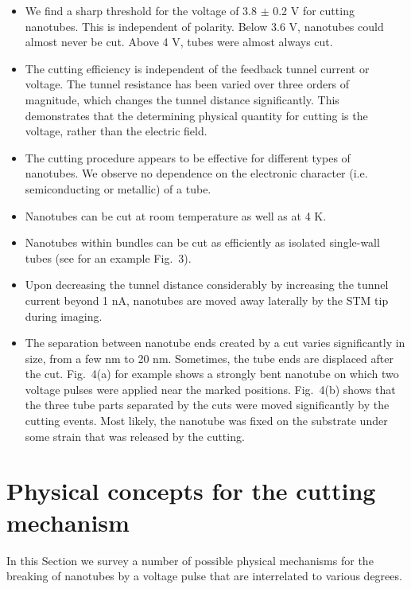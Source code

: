 \begin{multicols}{2}
\begin{itemize}
\item We find a sharp threshold for the voltage of 3.8 $\pm $ 0.2 V for cutting
nanotubes. This is independent of polarity. Below 3.6 V, nanotubes
could almost never be cut. Above 4 V, tubes were almost always
cut.

\item The cutting efficiency is independent of the feedback tunnel current
or voltage. The tunnel resistance has been varied over three
orders of magnitude, which changes the tunnel distance
significantly. This demonstrates that the determining physical
quantity for cutting is the voltage, rather than the electric
field.

\item The cutting procedure appears to be effective for different types
of nanotubes. We observe no dependence on the electronic character
(i.e. semiconducting or metallic) of a tube.

\item Nanotubes can be cut at room temperature as well as at 4 K.

\item Nanotubes within bundles can be cut as efficiently as isolated
single-wall tubes (see for an example Fig.~3).

\item Upon decreasing the tunnel distance considerably by increasing the tunnel
current beyond 1 nA, nanotubes are moved away laterally by the STM
tip during imaging.

\item The separation between nanotube ends created by a cut varies
significantly in size, from a few nm to 20 nm. Sometimes, the tube
ends are displaced after the cut. Fig.~4(a) for example shows a
strongly bent nanotube on which two voltage pulses were applied
near the marked positions. Fig.~4(b) shows that the three tube
parts separated by the cuts were moved significantly by the
cutting events. Most likely, the nanotube was fixed on the
substrate under some strain that was released by the cutting.
\end{itemize}

\section{Physical concepts for the cutting mechanism}

In this Section we survey a number of possible physical mechanisms
for the breaking of nanotubes by a voltage pulse that are
interrelated to various degrees\cite{comment_binding}.


\end{multicols}
